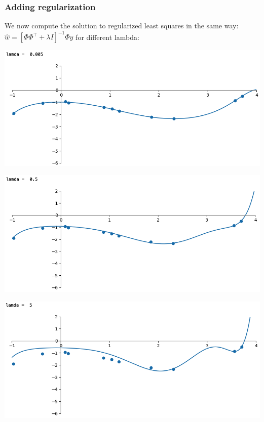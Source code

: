 \documentclass[10pt,aspectratio=169,handout]{beamer}
\begin{document}



\begin{frame}
    \frametitle{Adding regularization}

    We now compute the solution to regularized least squares in the same way: $\hat{w}=[\Phi\Phi^\intercal+\lambda I]^{-1}\Phi y$ for different lambda:\newline
    \begin{minipage}{0.32\textwidth}
        \includegraphics[width=\textwidth]{images/task5-1-3_l0005.png}
    \end{minipage}
    \begin{minipage}{0.32\textwidth}
        \includegraphics[width=\textwidth]{images/task5-1-3_l05.png}
    \end{minipage}
    \begin{minipage}{0.32\textwidth}
        \includegraphics[width=\textwidth]{images/task5-1-3_l5.png}

\end{minipage}
\end{frame}
\end{document}
